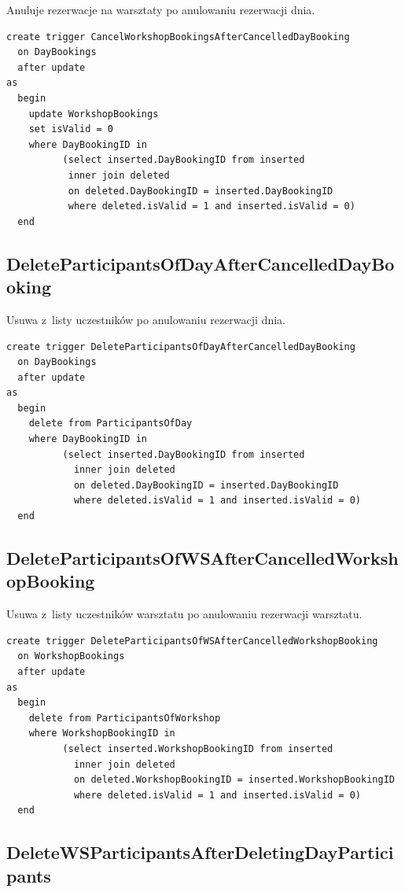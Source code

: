 \documentclass[12pt, a4paper]{mwrep}
\begin{document}
\noindent Anuluje rezerwacje na warsztaty po anulowaniu rezerwacji dnia.

\begin{lstlisting}
create trigger CancelWorkshopBookingsAfterCancelledDayBooking
  on DayBookings
  after update
as
  begin
    update WorkshopBookings
    set isValid = 0
    where DayBookingID in
          (select inserted.DayBookingID from inserted
           inner join deleted
           on deleted.DayBookingID = inserted.DayBookingID
           where deleted.isValid = 1 and inserted.isValid = 0)
  end
\end{lstlisting}

\subsection{DeleteParticipantsOfDayAfterCancelledDayBooking}

\noindent Usuwa z~listy uczestników po anulowaniu rezerwacji dnia.

\begin{lstlisting}
create trigger DeleteParticipantsOfDayAfterCancelledDayBooking
  on DayBookings
  after update
as
  begin
    delete from ParticipantsOfDay
    where DayBookingID in
          (select inserted.DayBookingID from inserted
            inner join deleted
            on deleted.DayBookingID = inserted.DayBookingID
            where deleted.isValid = 1 and inserted.isValid = 0)
  end
\end{lstlisting}

\subsection{DeleteParticipantsOfWSAfterCancelledWorkshopBooking}

\noindent Usuwa z~listy uczestników warsztatu po anulowaniu rezerwacji warsztatu.

\begin{lstlisting}
create trigger DeleteParticipantsOfWSAfterCancelledWorkshopBooking
  on WorkshopBookings
  after update
as
  begin
    delete from ParticipantsOfWorkshop
    where WorkshopBookingID in
          (select inserted.WorkshopBookingID from inserted
            inner join deleted
            on deleted.WorkshopBookingID = inserted.WorkshopBookingID
            where deleted.isValid = 1 and inserted.isValid = 0)
  end
\end{lstlisting}

\subsection{DeleteWSParticipantsAfterDeletingDayParticipants}
\end{document}
